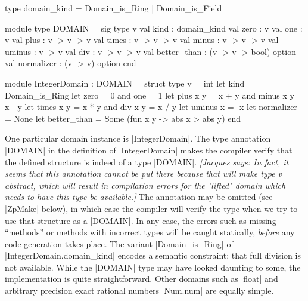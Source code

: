 \documentclass{elsart}
\newcommand{\jacques}[1]{{\it [Jacques says: #1]}}
\begin{document}
\begin{code}
type domain_kind = Domain_is_Ring | Domain_is_Field

module type DOMAIN = sig
  type v
  val kind : domain_kind
  val zero : v
  val one  : v
  val plus : v -> v -> v
  val times  : v -> v -> v
  val minus  : v -> v -> v
  val uminus : v -> v
  val div    : v -> v -> v
  val better_than : (v -> v -> bool) option
  val normalizer  : (v -> v) option
end 

module IntegerDomain : DOMAIN = struct
  type v = int
  let kind = Domain_is_Ring
  let zero = 0 and one = 1
  let plus x y = x + y  and  minus x y = x - y
  let times x y = x * y and  div x y = x / y
  let uminus x = -x
  let normalizer = None
  let better_than = Some (fun x y -> abs x > abs y)
end
\end{code}

One particular domain instance is |IntegerDomain|. The type annotation
|DOMAIN| in the definition of |IntegerDomain| makes the 
compiler verify that the defined structure is indeed of a type |DOMAIN|. 
\jacques{In fact, it seems that this annotation cannot be put there
because that will make type v abstract, which will result in compilation
errors for the "lifted" domain which needs to have this type be
available.}
The annotation may be omitted (see |ZpMake| below), in which
case the compiler will verify the type when we try to use that structure as a
|DOMAIN|. In any case, the errors such as missing ``methods'' or
methods with incorrect types will be caught statically, 
\emph{before} any code generation takes place. The variant
|Domain_is_Ring| of |IntegerDomain.domain_kind| encodes a semantic constraint:
that full division
is not available. While the |DOMAIN| type may have looked daunting to
some, the implementation is quite straightforward.  Other domains such
as |float| and arbitrary precision exact rational numbers |Num.num|
are equally simple.
\end{document}
